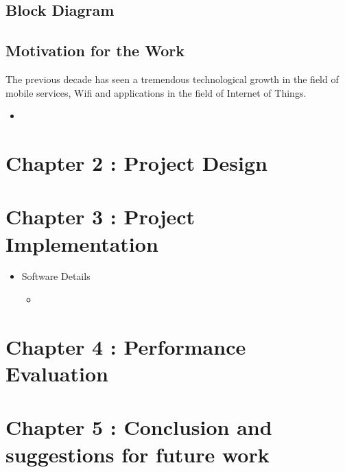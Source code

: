 \documentclass{article}
\begin{document}
\subsection{Block Diagram}

\subsection{Motivation for the Work}
The previous decade has seen a tremendous technological growth in the field of mobile services, Wifi and applications in the field of Internet of Things. 


\begin{itemize}
\item 
\end{itemize}
\section{Chapter 2 : Project Design}

\section{Chapter 3 : Project Implementation}
\begin{itemize}
\item Software Details
  \begin{itemize}
  \item 
  \end{itemize}
\end{itemize}
\section{Chapter 4 : Performance Evaluation}
\section{Chapter 5 : Conclusion and suggestions for future work}
\end{document}
